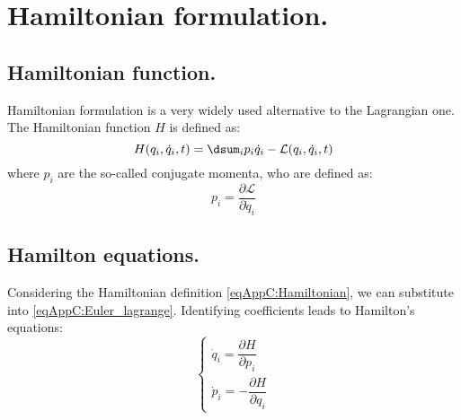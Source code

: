 \section{Hamiltonian formulation.}
%
%
	\subsection{Hamiltonian function.}
	\indent Hamiltonian formulation is a very widely used alternative to the Lagrangian one. The Hamiltonian function $H$ is defined as:
	\begin{equation}
	\label{eqAppC:Hamiltonian} H(q_i, \dot{q}_i,t) = \dsum_i p_i \dot{q}_i  - \mathcal{L}(q_i, \dot{q}_i, t)
	\end{equation}
	\noindent where $p_i$ are the so-called conjugate momenta, who are defined as:
	\begin{equation}
	\label{eqAppC:conj_mom}
	p_i = \dfrac{\partial \mathcal{L}}{\partial \dot{q}_i}
	\end{equation}
	\subsection{Hamilton equations.}
	\indent Considering the Hamiltonian definition \eqref{eqAppC:Hamiltonian}, we can substitute into \eqref{eqAppC:Euler_lagrange}. Identifying coefficients leads to Hamilton's equations:
	\begin{equation}
	\left\{ \begin{array}{ccc}
	\dot{q}_i = \dfrac{\partial H }{\partial p_i} \\
	\dot{p}_i = -\dfrac{\partial H}{\partial q_i}
	\end{array}\right.
	\label{eqAppC:Ham_eqs}
	\end{equation}
